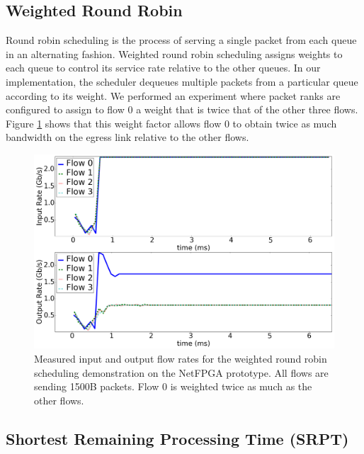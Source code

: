 
\subsection{Weighted Round Robin}\label{sec:wrr-demo}

Round robin scheduling is the process of serving a single packet from each queue in an alternating fashion.  Weighted round robin scheduling assigns weights to each queue to control its service rate relative to the other queues. In our implementation,  the scheduler dequeues multiple packets from a particular queue according to its weight. We performed an experiment where packet ranks are configured to assign to flow 0 a weight that is twice that of the other three flows. Figure \ref{fig:wrr_rates} shows that this weight factor allows flow 0 to obtain twice as much bandwidth on the egress link relative to the other flows.

\begin{figure}[!ht]
\includegraphics[width=1\linewidth]{figures/eval/wrr_rates}
\caption{Measured input and output flow rates for the weighted round robin scheduling demonstration on the NetFPGA prototype. All flows are sending 1500B packets. Flow 0 is weighted twice as much as the other flows.}
\label{fig:wrr_rates}
\end{figure}

\subsection{Shortest Remaining Processing Time (SRPT)}

